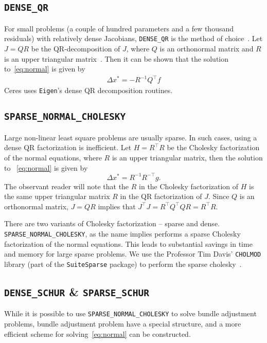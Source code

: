 \subsection{\texttt{DENSE\_QR}}
For small problems (a couple of hundred parameters and a few thousand residuals) with relatively dense Jacobians, \texttt{DENSE\_QR} is the method of choice~\cite{bjorck1996numerical}. Let $J = QR$ be the QR-decomposition of $J$, where $Q$ is an orthonormal matrix and $R$ is an upper triangular matrix~\cite{trefethen1997numerical}. Then it can be shown that the solution to~\eqref{eq:normal} is given by
\begin{align}
	\Delta x^* = -R^{-1}Q^\top f
\end{align}
Ceres uses \texttt{Eigen}'s dense QR decomposition routines.


\subsection{\texttt{SPARSE\_NORMAL\_CHOLESKY}}
Large non-linear least square problems are usually sparse. In such cases, using a dense QR factorization is inefficient. Let $H = R^\top R$ be the Cholesky factorization of the normal equations, where $R$ is an upper triangular matrix, then the  solution to ~\eqref{eq:normal} is given by
\begin{equation}
	\Delta x^* = R^{-1} R^{-\top} g.
\end{equation}
The observant reader will note that the $R$ in the Cholesky factorization of $H$ is the same upper triangular matrix $R$ in the QR factorization of $J$. Since $Q$ is an orthonormal matrix, $J=QR$ implies that $J^\top J = R^\top Q^\top Q R = R^\top R$.


There are two variants of Cholesky factorization -- sparse and dense. \texttt{SPARSE\_NORMAL\_CHOLESKY}, as the name implies performs a sparse Cholesky factorization of the normal equations. This leads to substantial savings in time and memory for large sparse problems. We use the Professor Tim Davis' \texttt{CHOLMOD} library (part of the \texttt{SuiteSparse} package) to perform the sparse cholesky~\cite{chen2006acs}.


\subsection{\texttt{DENSE\_SCHUR} \& \texttt{SPARSE\_SCHUR}}
While it is possible to use \texttt{SPARSE\_NORMAL\_CHOLESKY} to solve bundle adjustment problems, bundle adjustment problem have a special structure, and a more efficient scheme for solving~\eqref{eq:normal} can be constructed.

